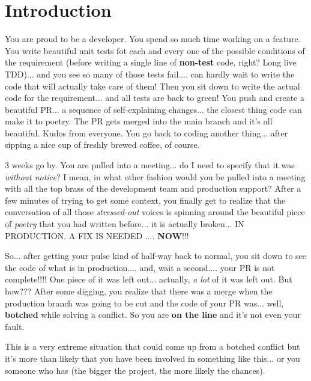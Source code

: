 
\section{Introduction}

You are proud to be a developer. You spend so much time working on a feature. You write beautiful unit tests
fot each and every one of the possible conditions of the requirement (before writing a single
line of {\bf non-test} code, right? Long live TDD)... and you see so many of those tests fail.... can hardly wait to
write the code that will actually take care of them! Then you sit down to write the actual code for the requirement...
and all tests are back to green! You push and create a beautiful PR... a sequence of self-explaining changes...
the closest thing code can make it to poetry. The PR gets merged into the main branch and it's all beautiful. Kudos
from everyone. You go back to coding another thing... after sipping a nice cup of freshly brewed coffee, of course.

3 weeks go by. You are pulled into a meeting... do I need to specify that it was {\it without notice}? I mean,
in what other fashion would you be pulled into a meeting with all the top brass of the development team and production
support? After a few minutes of trying to get some context, you finally get to realize that the conversation
of all those {\it stressed-out} voices is spinning around the beautiful piece of {\it poetry} that you had written
before... it is actually broken... IN PRODUCTION. A FIX IS NEEDED .... {\bf NOW}!!!

So... after getting your pulse kind of half-way back to normal, you sit down to see the code of what is in production....
and, wait a second.... your PR is not complete!!!! One piece of it was left out... actually, {\it a lot} of it was left
out. But how??? After some digging, you realize that there was a merge when the production branch was going to be cut
and the code of your PR was... well, {\bf botched} while solving a conflict. So you are {\bf on the line} and it's not
even your fault.

This is a very extreme situation that could come up from a botched conflict but it's more than likely that you have
been involved in something like this... or you someone who has (the bigger the project, the more likely the chances).

